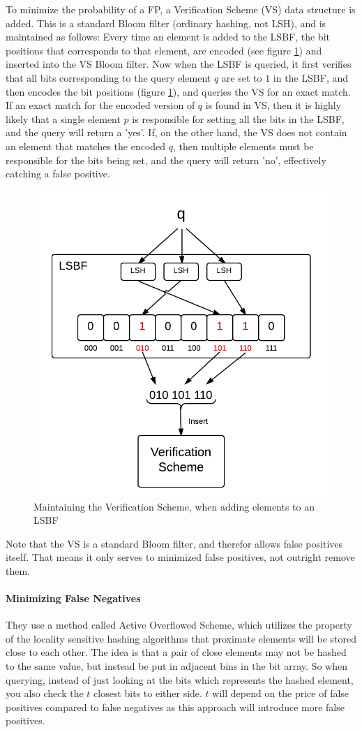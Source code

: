 \documentclass[a4paper,11pt]{article}
\begin{document}
To minimize the probability of a FP, a Verification Scheme (VS) data structure is added.
This is a standard Bloom filter (ordinary hashing, not LSH), and is maintained as follows: Every time an element is added to the LSBF, the bit positions that corresponds to that element, are encoded (see figure \ref{fig:verification_scheme}) and inserted into the VS Bloom filter.
Now when the LSBF is queried, it first verifies that all bits corresponding to the query element $q$ are set to $1$ in the LSBF, and then encodes the bit positions (figure \ref{fig:verification_scheme}), and queries the VS for an exact match. If an exact match for the encoded version of $q$ is found in VS, then it is highly likely that a single element $p$ is responsible for setting all the bits in the LSBF, and the query will return a 'yes'. If, on the other hand, the VS does not contain an element that matches the encoded $q$, then multiple elements must be responsible for the bits being set, and the query will return 'no', effectively catching a false positive.

\begin{figure}[H]
\centering
\includegraphics[width=.5\linewidth]{verification_scheme}
\caption{Maintaining the Verification Scheme, when adding elements to an LSBF}
\label{fig:verification_scheme}
\end{figure}


Note that the VS is a standard Bloom filter, and therefor allows false positives itself. That means it only serves to minimized false positives, not outright remove them.

\paragraph{Minimizing False Negatives}
They use a method called Active Overflowed Scheme, which utilizes the property of the locality sensitive hashing algorithms that proximate elements will be stored close to each other. The idea is that a pair of close elements may not be hashed to the same value, but instead be put in adjacent bins in the bit array. So when querying, instead of just looking at the bits which represents the hashed element, you also check the $t$ closest bits to either side. $t$ will depend on the price of false positives compared to false negatives as this approach will introduce more false positives.
\end{document}
